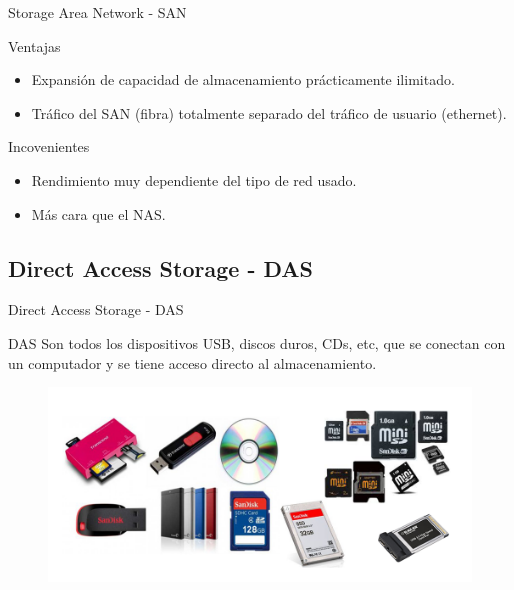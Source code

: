 \documentclass[10pt]{beamer}
\begin{document}
\begin{frame}{Storage Area Network - SAN}
\begin{alertblock}{Ventajas}
\begin{itemize}
\item Expansión de capacidad de almacenamiento prácticamente ilimitado.
\item Tráfico del SAN (fibra) totalmente separado del tráfico de usuario (ethernet).
\end{itemize}
\begin{alertblock}{Incovenientes}
\begin{itemize}
\item Rendimiento muy dependiente del tipo de red usado.
\item Más cara que el NAS.
\end{itemize}
\end{alertblock}

\end{alertblock}

\end{frame}

\subsection{Direct Access Storage - DAS}

\begin{frame}{Direct Access Storage - DAS}
\begin{alertblock}{DAS}
Son todos los dispositivos USB, discos duros, CDs, etc, que se conectan con un computador y se tiene acceso directo al almacenamiento.
\end{alertblock}

\begin{figure}[h]
\center
\includegraphics[scale=4]{das.png}
\end{figure}
\end{frame}
\end{document}
